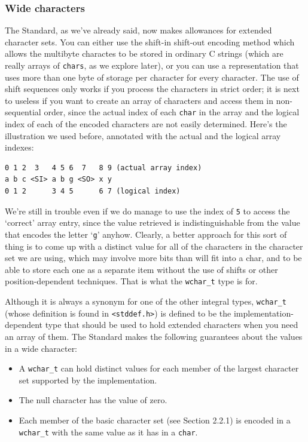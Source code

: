    

   \subsubsection{Wide characters}
    

    The Standard, as we've already said, now makes allowances for extended
     character sets. You can either use the shift-in shift-out encoding method
     which allows the multibyte charactes to be stored in ordinary C strings
     (which are really arrays of \texttt{chars}, as we explore later), or
     you can use a representation that uses more than one byte of storage per
     character for every character. The use of shift sequences only works if
     you process the characters in strict order; it is next to useless if you
     want to create an array of characters and access them in non-sequential
     order, since the actual index of each \texttt{char} in the array and
     the logical index of each of the encoded characters are not easily
     determined. Here's the illustration we used before, annotated with the
     actual and the logical array indexes:


    \begin{Verbatim}
0 1 2  3   4 5 6  7   8 9 (actual array index)
a b c <SI> a b g <SO> x y
0 1 2      3 4 5      6 7 (logical index)
\end{Verbatim}

    We're still in trouble even if we do manage to use the index
     of \texttt{5} to access the `correct' array entry, since
     the value retrieved is indistinguishable from the value that encodes the
     letter `\texttt{g}' anyhow. Clearly, a better approach for
     this sort of thing is to come up with a distinct value for all of the
     characters in the character set we are using, which may involve more bits
     than will fit into a char, and to be able to store each one as a separate
     item without the use of shifts or other position-dependent techniques.
     That is what the \texttt{wchar\_t} type is for.


    Although it is always a synonym for one of the other integral types,
     \texttt{wchar\_t} (whose definition is found in
     \texttt{<stddef.h>}) is defined to be the
     implementation-dependent type that should be used to hold extended
     characters when you need an array of them. The Standard makes the
     following guarantees about the values in a wide character:


    \begin{itemize}
     \item A \texttt{wchar\_t} can hold distinct values for each member of
      the largest character set supported by the implementation.

     \item The null character has the value of zero.

     \item Each member of the basic character set (see Section 2.2.1) is encoded in a \texttt{wchar\_t} with the same value
      as it has in a \texttt{char}.
    \end{itemize}

